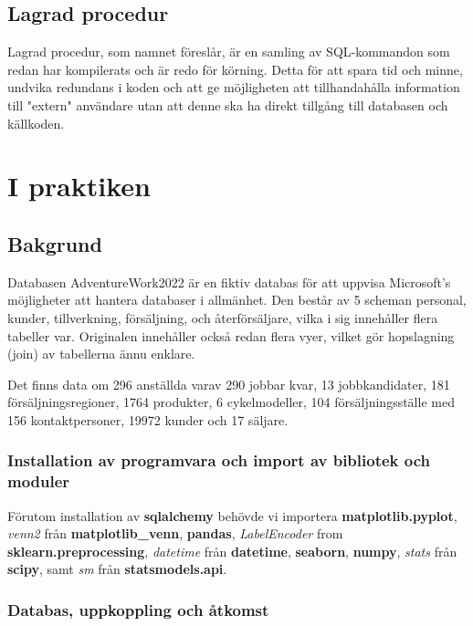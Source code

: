 \documentclass[10pt]{article}
\begin{document}
\subsection{Lagrad procedur}

Lagrad procedur, som namnet föreslår, är en samling av SQL-kommandon som redan har kompilerats och är redo för körning. Detta för att spara tid och minne, undvika redundans i koden och att ge möjligheten att tillhandahålla information till "extern" användare utan att denne ska ha direkt tillgång till databasen och källkoden.

\section{I praktiken}

\subsection{Bakgrund}

Databasen AdventureWork2022 är en fiktiv databas för att uppvisa Microsoft's möjligheter att hantera databaser i allmänhet. Den består av 5 scheman personal, kunder, tillverkning, försäljning, och återförsäljare, vilka i sig innehåller flera tabeller var. Originalen innehåller också redan flera vyer, vilket gör hopslagning (join) av tabellerna ännu enklare.

Det finns data om 296 anställda varav 290 jobbar kvar, 13 jobbkandidater, 181 försäljningsregioner, 1764 produkter, 6 cykelmodeller, 104 försäljningsställe med 156 kontaktpersoner, 19972 kunder och 17 säljare.

\subsubsection{Installation av programvara och import av bibliotek och moduler}

Förutom installation av \textbf{sqlalchemy} behövde vi importera \textbf{matplotlib.pyplot}, \emph{venn2} från \textbf{matplotlib\_venn}, \textbf{pandas}, \emph{LabelEncoder} from \textbf{sklearn.preprocessing}, \emph{datetime} från \textbf{datetime}, \textbf{seaborn}, \textbf{numpy}, \emph{stats} från \textbf{scipy}, samt \emph{sm} från \textbf{statsmodels.api}.

\subsubsection{Databas, uppkoppling och åtkomst}
\end{document}
